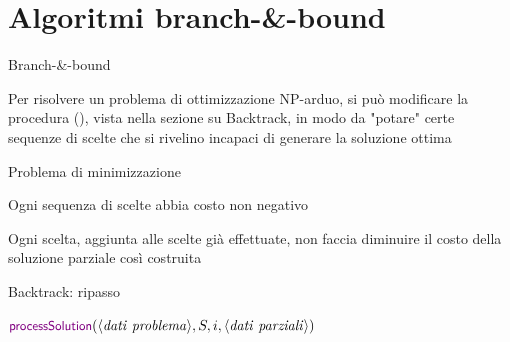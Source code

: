 \section{Algoritmi branch-\&-bound}

\begin{frame}{Branch-\&-bound}

\vspace{-9pt}
\begin{myboxtitle}
Per risolvere un problema di ottimizzazione NP-arduo, si può modificare la
procedura \enumerazione(), vista nella sezione su Backtrack, in modo da
"potare" certe sequenze di scelte che si rivelino incapaci di
generare la soluzione ottima
\end{myboxtitle}

\begin{myboxtitle}
\BIL
\item Problema di minimizzazione
\item Ogni sequenza di scelte abbia costo non negativo
\item Ogni scelta, aggiunta alle scelte già effettuate, non faccia 
diminuire il costo della soluzione parziale così costruita
\EIL
\end{myboxtitle}
    
\end{frame}

\begin{frame}{Backtrack: ripasso}

\vspace{-9pt}    
\begin{Procedure}
\caption[A]{\textcolor{violet}{\enumerazione}($\langle \mathit{dati\ problema} \rangle$, $\Item[\,]\ S$, \INTEGER\ $i$, $\langle \mathit{dati\ parziali} \rangle)$}
{
  $\textcolor{violet}{\textsf{{\small processSolution}}}(\langle \mathit{dati\ problema} \rangle, S, i, \langle \mathit{dati\ parziali} \rangle)$\;
  
  \alert{\Return \TRUE}
}
\end{Procedure}
        
\end{frame}

